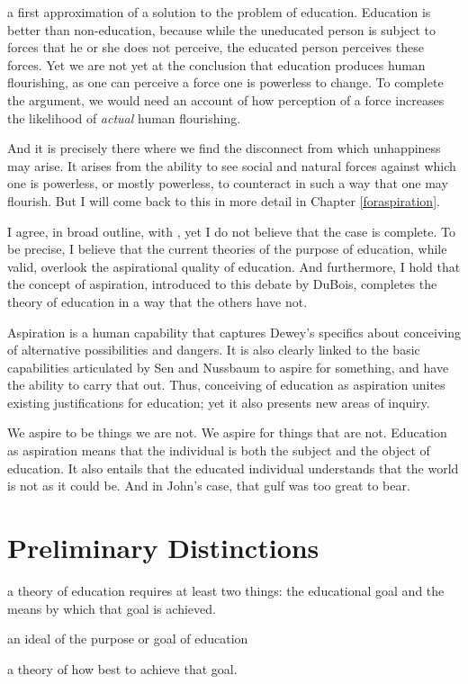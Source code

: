  a first approximation of a solution to the problem of education. Education is better than non-education, because while the uneducated person is subject to forces that he or she does not perceive, the educated person perceives these forces. Yet we are not yet at the conclusion that education produces human flourishing, as one can perceive a force one is powerless to change. To complete the argument, we would need an account of how perception of a force increases the likelihood of \emph{actual} human flourishing. 

And it is precisely there where we find the disconnect from which unhappiness may arise. It arises from the ability to see social and natural forces against which one is powerless, or mostly powerless, to counteract in such a way that one may flourish. But I will come back to this in more detail in Chapter \ref{foraspiration}.

I agree, in broad outline, with , yet I do not believe that the case is complete. To be precise, I believe that the current theories of the purpose of education, while valid, overlook the aspirational quality of education. And furthermore, I hold that the concept of aspiration, introduced to this debate by DuBois, completes the theory of education in a way that the others have not.

Aspiration is a human capability that captures Dewey's specifics about conceiving of alternative possibilities and dangers. It is also clearly linked to the basic capabilities articulated by Sen and Nussbaum to aspire for something, and have the ability to carry that out. Thus, conceiving of education as aspiration unites existing justifications for education; yet it also presents new areas of inquiry. 

We aspire to be things we are not. We aspire for things that are not. Education as aspiration means that the individual is both the subject and the object of education. It also entails that the educated individual understands that the world is not as it could be. And in John's case, that gulf was too great to bear. 

\section{Preliminary Distinctions}
\label{preliminarydistinctions}

 a theory of education requires at least two things: the educational goal and the means by which that goal is achieved. 
\begin{purpose}\label{thesis:educationalgoal}
an ideal of the purpose or goal of education 
\end{purpose}
\begin{thesis}\label{thesis:educationalmeans}
a theory of how best to achieve that goal.  
\end{thesis}

